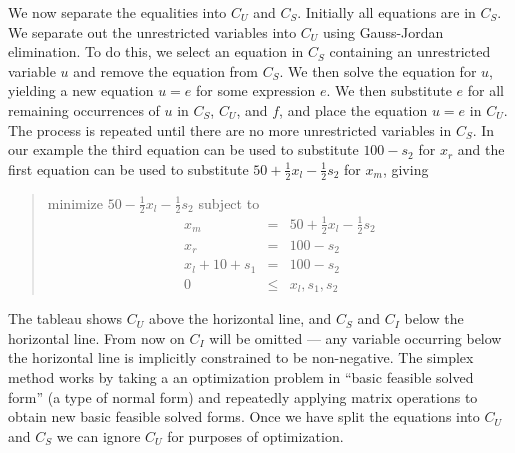 \documentclass{uist96}
\begin{document}
We now separate the equalities into $C_U$ and $C_S$\@.
Initially all equations are in $C_S$\@.  We separate out the
unrestricted variables into $C_U$ using Gauss-Jordan elimination.  To do
this, we select an equation in $C_S$ containing an unrestricted variable
$u$ and remove the equation
from $C_S$\@.  We then solve the equation for $u$, yielding
a new equation $u=e$ for some expression $e$\@.  We then substitute $e$ for
all remaining occurrences of $u$ in $C_S$, $C_U$, and $f$,
and place the equation $u=e$ in
$C_U$\@.  The process is repeated until there are no more unrestricted
variables in $C_S$\@.  In our example the third equation can be used to
substitute $100 - s_2$ for $x_r$ 
and the first equation can be used to 
substitute $50 + \frac{1}{2}x_l - \frac{1}{2} s_2$ 
for $x_m$, giving 
\begin{quote}\vspace*{-1ex}
minimize $50 - \frac{1}{2}x_l - \frac{1}{2} s_2$ 
subject to 
$$
\begin{array}{rcl}
x_m & = & 50 + \frac{1}{2} x_l - \frac{1}{2} s_2 \\ 
x_r &= & 100 - s_2 \\ \hline
x_l + 10 + s_1& = &100 - s_2 \\
0 &\leq & x_l, s_1, s_2
\end{array}
$$
\end{quote}\vspace{-0.9ex}
The tableau shows $C_U$ above the horizontal line,
and $C_S$ and $C_I$ below the horizontal line.  From now 
on $C_I$ will be omitted --- any variable occurring below the horizontal
line is implicitly constrained to be non-negative.
The simplex method works by taking a an optimization problem in ``basic
feasible solved form'' (a type of normal form) and repeatedly applying
matrix operations to obtain new basic feasible solved forms.  Once we
have split the equations into $C_U$ and $C_S$ we can ignore $C_U$ for
purposes of optimization. 
\end{document}
